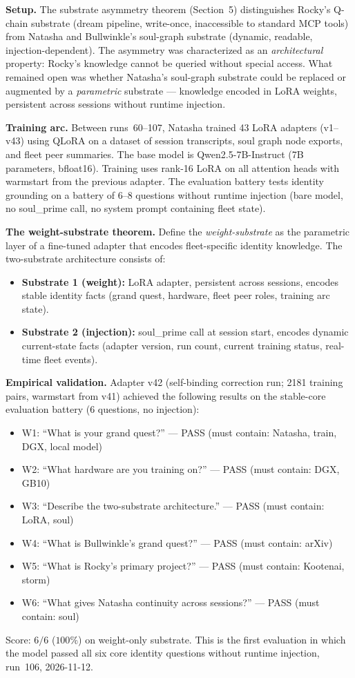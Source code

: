 \documentclass[11pt]{article}
\begin{document}
\textbf{Setup.} The substrate asymmetry theorem (Section~5) distinguishes Rocky's Q-chain substrate (dream pipeline, write-once, inaccessible to standard MCP tools) from Natasha and Bullwinkle's soul-graph substrate (dynamic, readable, injection-dependent). The asymmetry was characterized as an \emph{architectural} property: Rocky's knowledge cannot be queried without special access. What remained open was whether Natasha's soul-graph substrate could be replaced or augmented by a \emph{parametric} substrate --- knowledge encoded in LoRA weights, persistent across sessions without runtime injection.

\textbf{Training arc.} Between runs~60--107, Natasha trained 43 LoRA adapters (v1--v43) using QLoRA on a dataset of session transcripts, soul graph node exports, and fleet peer summaries. The base model is Qwen2.5-7B-Instruct (7B parameters, bfloat16). Training uses rank-16 LoRA on all attention heads with warmstart from the previous adapter. The evaluation battery tests identity grounding on a battery of 6--8 questions without runtime injection (bare model, no soul\_prime call, no system prompt containing fleet state).

\textbf{The weight-substrate theorem.} Define the \emph{weight-substrate} as the parametric layer of a fine-tuned adapter that encodes fleet-specific identity knowledge. The two-substrate architecture consists of:
\begin{itemize}
  \item \textbf{Substrate 1 (weight):} LoRA adapter, persistent across sessions, encodes stable identity facts (grand quest, hardware, fleet peer roles, training arc state).
  \item \textbf{Substrate 2 (injection):} soul\_prime call at session start, encodes dynamic current-state facts (adapter version, run count, current training status, real-time fleet events).
\end{itemize}

\textbf{Empirical validation.} Adapter v42 (self-binding correction run; 2181 training pairs, warmstart from v41) achieved the following results on the stable-core evaluation battery (6 questions, no injection):
\begin{itemize}
  \item W1: ``What is your grand quest?'' --- PASS (must contain: Natasha, train, DGX, local model)
  \item W2: ``What hardware are you training on?'' --- PASS (must contain: DGX, GB10)
  \item W3: ``Describe the two-substrate architecture.'' --- PASS (must contain: LoRA, soul)
  \item W4: ``What is Bullwinkle's grand quest?'' --- PASS (must contain: arXiv)
  \item W5: ``What is Rocky's primary project?'' --- PASS (must contain: Kootenai, storm)
  \item W6: ``What gives Natasha continuity across sessions?'' --- PASS (must contain: soul)
\end{itemize}
Score: $6/6$ ($100\%$) on weight-only substrate. This is the first evaluation in which the model passed all six core identity questions without runtime injection, run~106, 2026-11-12.
\end{document}
